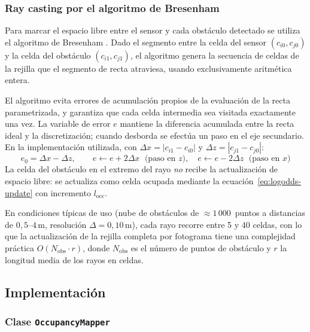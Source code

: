 \subsubsection{Ray casting por el algoritmo de Bresenham}
\label{subsubsec:lm-v5-bresenham}

Para marcar el espacio libre entre el sensor y cada obstáculo detectado se
utiliza el algoritmo de Bresenham \cite{Bresenham1965}. Dado el segmento entre
la celda del sensor $(c_{i0}, c_{j0})$ y la celda del obstáculo
$(c_{i1}, c_{j1})$, el algoritmo genera la secuencia de celdas de la rejilla
que el segmento de recta atraviesa, usando exclusivamente aritmética entera.

El algoritmo evita errores de acumulación propios de la evaluación de la recta
parametrizada, y garantiza que cada celda intermedia sea visitada exactamente
una vez. La variable de error $e$ mantiene la diferencia acumulada entre la
recta ideal y la discretización; cuando desborda se efectúa un paso en el eje
secundario. En la implementación utilizada, con $\Delta x = |c_{i1} - c_{i0}|$
y $\Delta z = |c_{j1} - c_{j0}|$:
%
\begin{equation}
  \label{eq:bresenham-recurrence}
  e_0 = \Delta x - \Delta z, \qquad
  e \leftarrow e + 2 \Delta x \;\text{ (paso en $z$)}, \quad
  e \leftarrow e - 2 \Delta z \;\text{ (paso en $x$)}
\end{equation}
%
La celda del obstáculo en el extremo del rayo \emph{no} recibe la
actualización de espacio libre: se actualiza como celda ocupada mediante la
ecuación~\ref{eq:logodds-update} con incremento $l_{\text{occ}}$.

En condiciones típicas de uso (nube de obstáculos de $\approx\!1\,000$~puntos
a distancias de $0{,}5$--$4\,\text{m}$, resolución $\Delta = 0{,}10\,\text{m}$),
cada rayo recorre entre 5 y 40 celdas, con lo que la actualización de la
rejilla completa por fotograma tiene una complejidad práctica
$O(N_{\text{obs}} \cdot r)$, donde $N_{\text{obs}}$ es el número de puntos
de obstáculo y $r$ la longitud media de los rayos en celdas.

\subsection{Implementación}
\label{subsec:lm-v5-impl}

\subsubsection{Clase \texttt{OccupancyMapper}}
\label{subsubsec:lm-v5-clase}

